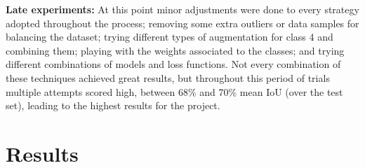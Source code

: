 \documentclass[11pt]{article}
\begin{document}
\begin{multicols}{2}
        \textbf{Late experiments:}
         At this point minor adjustments were done to every strategy adopted throughout the process; removing some extra outliers or data samples for balancing the dataset; trying different types of augmentation for class 4 and combining them; playing with the weights associated to the classes; and trying different combinations of models and loss functions.
         Not every combination of these techniques achieved great results, but throughout this period of trials multiple attempts scored high, between 68\% and 70\% mean IoU (over the test set), leading to the highest results for the project.
        
        
    \section{Results}



\end{multicols}
\end{document}
